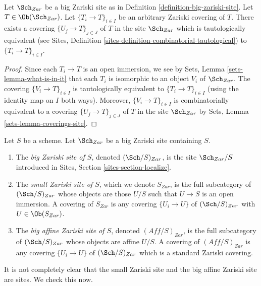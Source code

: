 \begin{lemma}
\label{lemma-zariski-induced}
Let $\Sch_{Zar}$ be a big Zariski site as in
Definition \ref{definition-big-zariski-site}.
Let $T \in \Ob(\Sch_{Zar})$.
Let $\{T_i \to T\}_{i \in I}$ be an arbitrary Zariski covering of $T$.
There exists a covering $\{U_j \to T\}_{j \in J}$ of $T$ in the site
$\Sch_{Zar}$ which is tautologically equivalent (see
Sites, Definition \ref{sites-definition-combinatorial-tautological})
to $\{T_i \to T\}_{i \in I}$.
\end{lemma}

\begin{proof}
Since each $T_i \to T$ is an open immersion, we see by
Sets, Lemma \ref{sets-lemma-what-is-in-it}
that each $T_i$ is isomorphic to an object $V_i$ of $\Sch_{Zar}$.
The covering $\{V_i \to T\}_{i \in I}$ is tautologically equivalent
to $\{T_i \to T\}_{i \in I}$ (using the identity map on $I$ both ways).
Moreover, $\{V_i \to T\}_{i \in I}$ is combinatorially equivalent to a
covering $\{U_j \to T\}_{j \in J}$ of $T$ in the site $\Sch_{Zar}$ by
Sets, Lemma \ref{sets-lemma-coverings-site}.
\end{proof}

\begin{definition}
\label{definition-big-small-Zariski}
Let $S$ be a scheme. Let $\Sch_{Zar}$ be a big Zariski
site containing $S$.
\begin{enumerate}
\item The {\it big Zariski site of $S$}, denoted
$(\Sch/S)_{Zar}$, is the site $\Sch_{Zar}/S$
introduced in Sites, Section \ref{sites-section-localize}.
\item The {\it small Zariski site of $S$}, which we denote
$S_{Zar}$, is the full subcategory of $(\Sch/S)_{Zar}$
whose objects are those $U/S$ such that $U \to S$ is an open immersion.
A covering of $S_{Zar}$ is any covering $\{U_i \to U\}$ of
$(\Sch/S)_{Zar}$ with $U \in \Ob(S_{Zar})$.
\item The {\it big affine Zariski site of $S$}, denoted
$(\textit{Aff}/S)_{Zar}$, is the full subcategory of
$(\Sch/S)_{Zar}$ whose objects are affine $U/S$.
A covering of $(\textit{Aff}/S)_{Zar}$ is any covering
$\{U_i \to U\}$ of $(\Sch/S)_{Zar}$ which is a
standard Zariski covering.
\end{enumerate}
\end{definition}

\noindent
It is not completely clear that the small Zariski site and
the big affine Zariski site are sites. We check this now.

